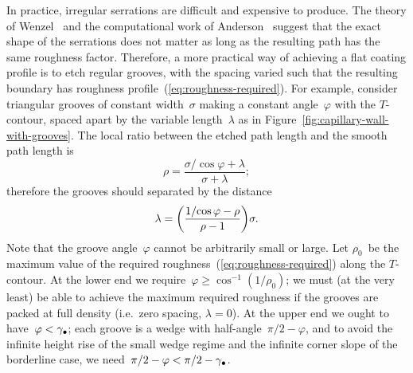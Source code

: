 In practice, irregular serrations are difficult and expensive to produce.
The theory of Wenzel~\cite{wenzel-1936-resistance-solid-surfaces-wetting}
and the computational work of Anderson~\cite[Section~6.4.5]%
  {anderson-2002-thesis-boundary-tracing-pdes}
suggest that the exact shape of the serrations does not matter
as long as the resulting path has the same roughness factor.
Therefore, a more practical way of achieving a flat coating profile
is to etch regular grooves,
with the spacing varied such that
the resulting boundary has roughness profile~(\ref{eq:roughness-required}).
For example, consider triangular grooves of constant width~$\sigma$
making a constant angle~$\varphi$ with the $T$-contour,
spaced apart by the variable length~$\lambda$
as in Figure~\ref{fig:capillary-wall-with-grooves}.
The local ratio
between the etched path length and the smooth path length
is
\begin{equation}
  \rho = \frac{\sigma / {\cos\varphi} + \lambda}{\sigma + \lambda};
  \label{eq:regular-groove-roughness}
\end{equation}
therefore the grooves should separated by the distance
\begin{equation}
  \lambda = \roundbr*{\frac{1 / {\cos\varphi} - \rho}{\rho - 1}} \sigma.
  \label{eq:regular-groove-spacing}
\end{equation}
Note that the groove angle~$\varphi$ cannot be arbitrarily small or large.
Let $\rho_0$~be the maximum value
of the required roughness~(\ref{eq:roughness-required})
along the $T$-contour.
At the lower end we require~$\varphi \ge \cos^{-1} (1 / \rho_0)$;
we must (at the very least) be able to achieve the maximum required roughness
if the grooves are packed at full density (i.e.~zero spacing, $\lambda = 0$).
At the upper end we ought to have~$\varphi < \gamma_\bullet$;
each groove is a wedge with half-angle~$\pi/2 - \varphi$,
and to avoid the infinite height rise of the small wedge regime
and the infinite corner slope of the borderline case,
we need~$\pi/2 - \varphi < \pi/2 - \gamma_\bullet$.

